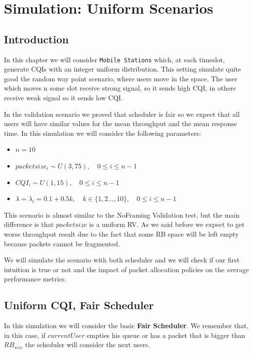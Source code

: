\chapter{Simulation: Uniform Scenarios}
\section{Introduction}
In this chapter we will consider \texttt{Mobile Stations} which, at each timeslot, generate CQIs with an integer uniform distribution. This setting simulate quite good the random way point scenario, where users move in the space. The user which moves n some slot receive strong signal, so it sends high CQI, in others receive weak signal so it sends low CQI.

In the validation scenario we proved that scheduler is fair so we expect that all users will have similar values for the mean throughput and the mean response time. In this simulation we will consider the following parameters:
\begin{itemize}
	\item \(n=10\)
	\item \(packetsize_{i} \sim U(3,75), \quad 0 \le i \le n-1\)
	\item \(CQI_{i} \sim U(1,15), \quad 0 \le i \le n-1\)
	\item \( \lambda = \lambda_{i} = 0.1 + 0.5k, \quad k\in\{1,2\ldots,10\}, \quad 0 \le i \le n-1\)
\end{itemize}
This scenario is almost similar to the NoFraming Validation test, but the main difference is that \(packetsize\) is a uniform RV. As we said before we expect to get worse throughput result due to the fact that some RB space will be left empty because packets cannot be fragmented. 

We will simulate the scenario with both scheduler and we will check if our first intuition is true or not and the impact of packet allocation policies on the average performance metrics.

\section{Uniform CQI, Fair Scheduler}
In this simulation we will consider the basic \textbf{Fair Scheduler}. We remember that, in this case, if \(currentUser\) empties his queue or has a packet that is bigger than \(RB_{size}\) the scheduler will consider the next users.

